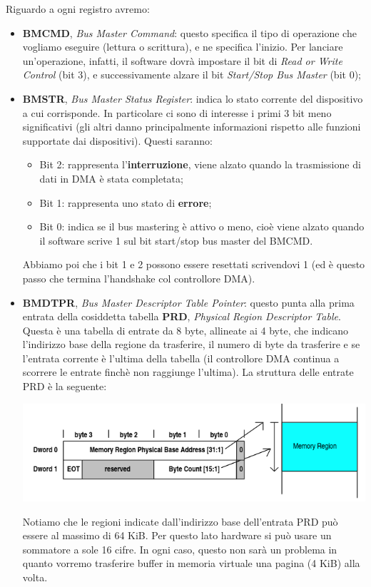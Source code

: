 \documentclass[a4paper,11pt]{article}
\begin{document}
Riguardo a ogni registro avremo:
\begin{itemize}
	\item \textbf{BMCMD}, \textit{Bus Master Command}: questo specifica il tipo di operazione che vogliamo eseguire (lettura o scrittura), e ne specifica l'inizio.
		Per lanciare un'operazione, infatti, il software dovrà impostare il bit di \textit{Read or Write Control} (bit 3), e successivamente alzare il bit \textit{Start/Stop Bus Master} (bit 0);
	\item \textbf{BMSTR}, \textit{Bus Master Status Register}: indica lo stato corrente del dispositivo a cui corrisponde. In particolare ci sono di interesse i primi 3 bit meno significativi (gli altri danno principalmente informazioni rispetto alle funzioni supportate dai dispositivi).
		Questi saranno:
		\begin{itemize}
			\item Bit 2: rappresenta l'\textbf{interruzione}, viene alzato quando la trasmissione di dati in DMA è stata completata;
			\item Bit 1: rappresenta uno stato di \textbf{errore};
			\item Bit 0: indica se il bus mastering è attivo o meno, cioè viene alzato quando il software scrive 1 sul bit start/stop bus master del BMCMD.
		\end{itemize}
		Abbiamo poi che i bit 1 e 2 possono essere resettati scrivendovi 1 (ed è questo passo che termina l'handshake col controllore DMA).
	\item \textbf{BMDTPR}, \textit{Bus Master Descriptor Table Pointer}: questo punta alla prima entrata della cosiddetta tabella \textbf{PRD}, \textit{Physical Region Descriptor Table}. Questa è una tabella di entrate da 8 byte, allineate ai 4 byte, che indicano l'indirizzo base della regione da trasferire, il numero di byte da trasferire e se l'entrata corrente è l'ultima della tabella (il controllore DMA continua a scorrere le entrate finchè non raggiunge l'ultima).
		La struttura delle entrate PRD è la seguente:
		\begin{center}
			\includegraphics[scale=0.8]{../figures/prd.png}
		\end{center}
		Notiamo che le regioni indicate dall'indirizzo base dell'entrata PRD può essere al massimo di 64 KiB. Per questo lato hardware si può usare un sommatore a sole 16 cifre.
		In ogni caso, questo non sarà un problema in quanto vorremo trasferire buffer in memoria virtuale una pagina (4 KiB) alla volta.
\end{itemize}
\end{document}
